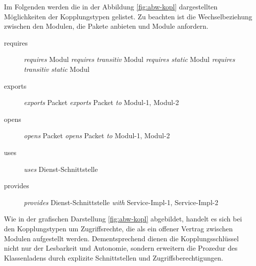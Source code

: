     Im Folgenden werden die in der Abbildung \ref{fig:abw-kopl} dargestellten Möglichkeiten der Kopplungstypen gelistet. Zu beachten ist die Wechselbeziehung zwischen den Modulen, die Pakete anbieten und Module anfordern. \cite{jmsOracle}

    \begin{description}
      \item[requires]\hfill
      \newline \textit{requires} Modul
      \newline \textit{requires transitiv} Modul
      \newline \textit{requires static} Modul
      \newline \textit{requires transitiv static} Modul
      \item[exports]\hfill
      \newline \textit{exports} Packet
      \newline \textit{exports} Packet \textit{to} Modul-1, Modul-2
      \item[opens]\hfill
      \newline \textit{opens} Packet
      \newline \textit{opens} Packet \textit{to} Modul-1, Modul-2
      \item [uses]\hfill
      \newline \textit{uses} Dienst-Schnittstelle 
      \item[provides]\hfill
        \newline \textit{provides} Dienst-Schnittstelle \textit{with} Service-Impl-1, Service-Impl-2
  \end{description}


  Wie in der grafischen Darstellung \ref{fig:abw-kopl} abgebildet, handelt es sich bei den Kopplungstypen um Zugriffsrechte, die als ein offener Vertrag zwischen Modulen aufgestellt werden. Dementsprechend dienen die Kopplungsschlüssel nicht nur der Lesbarkeit und Autonomie, sondern erweitern die Prozedur des Klassenladens durch explizite Schnittstellen und Zugriffsberechtigungen.\cite{modulMitJava9}

